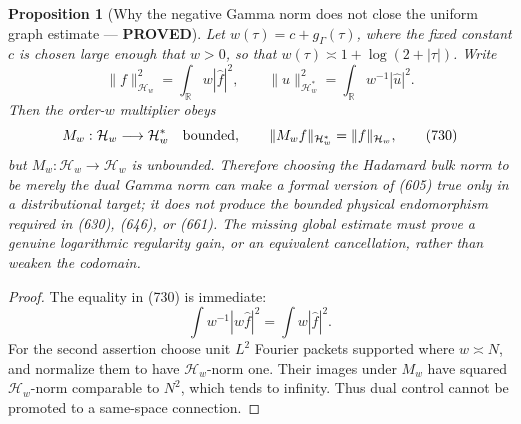 \documentclass[11pt]{article}
\newtheorem{proposition}[theorem]{Proposition}
\newcommand{\PROVED}{\textcolor{green!45!black}{\textbf{PROVED}}}
\begin{document}
\begin{proposition}[Why the negative Gamma norm does not close the uniform
graph estimate --- \PROVED]
Let \(w(\tau)=c+g_\Gamma(\tau)\), where the fixed constant \(c\) is chosen
large enough that \(w>0\), so that
\(w(\tau)\asymp1+\log(2+|\tau|)\).  Write
\[
 \|f\|_{\mathcal H_w}^2=\int_{\mathbb R}w|\widehat f|^2,\qquad
 \|u\|_{\mathcal H_w^*}^2=\int_{\mathbb R}w^{-1}|\widehat u|^2.
\]
Then the order-\(w\) multiplier obeys
\begin{equation}
 M_w:\mathcal H_w\longrightarrow\mathcal H_w^*
 \quad\hbox{bounded},\qquad
 \|M_wf\|_{\mathcal H_w^*}=\|f\|_{\mathcal H_w},    \tag{730}
\end{equation}
but \(M_w:\mathcal H_w\to\mathcal H_w\) is unbounded.  Therefore choosing
the Hadamard bulk norm to be merely the dual Gamma norm can make a formal
version of (605) true only in a distributional target; it does not produce
the bounded physical endomorphism required in (630), (646), or (661).
The missing global estimate must prove a genuine logarithmic regularity
gain, or an equivalent cancellation, rather than weaken the codomain.
\end{proposition}

\begin{proof}
The equality in (730) is immediate:
\[
 \int w^{-1}|w\widehat f|^2=\int w|\widehat f|^2.
\]
For the second assertion choose unit \(L^2\) Fourier packets supported
where \(w\asymp N\), and normalize them to have \(\mathcal H_w\)-norm one.
Their images under \(M_w\) have squared \(\mathcal H_w\)-norm comparable
to \(N^2\), which tends to infinity.  Thus dual control cannot be promoted
to a same-space connection.
\end{proof}
\end{document}
